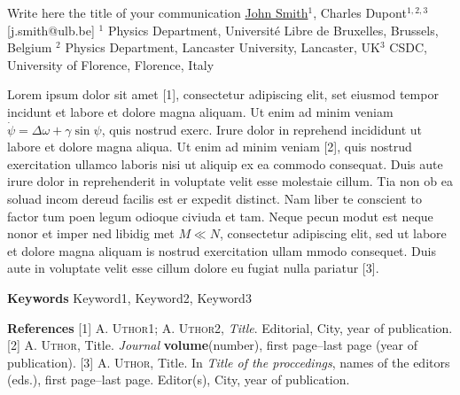 


\begin{abstract_online}{Write here the title of your communication}{%
        \underline{John Smith}$^{1}$, Charles Dupont$^{1,2,3}$}{[j.smith@ulb.be]
        }{%
        $^1$ Physics Department, Université Libre de Bruxelles, Brussels, Belgium \newline{}$^2$ Physics Department, Lancaster University, Lancaster, UK\newline{}$^3$ CSDC, University of Florence, Florence, Italy}
    
Lorem ipsum dolor sit amet [1], consectetur adipiscing elit, set eiusmod tempor incidunt et labore et dolore magna aliquam. Ut enim ad minim veniam $\dot \psi = \Delta \omega + \gamma \sin \psi $, quis nostrud exerc. Irure dolor in reprehend incididunt ut labore et dolore magna aliqua. Ut enim ad minim veniam [2], quis nostrud exercitation ullamco laboris nisi ut aliquip ex ea commodo consequat. Duis aute irure dolor in reprehenderit in voluptate velit esse molestaie cillum. Tia non ob ea soluad incom dereud facilis est er expedit distinct. Nam liber te conscient to factor tum poen legum odioque civiuda et tam. Neque pecun modut est neque nonor et imper ned libidig met $M \ll N$, consectetur adipiscing elit, sed ut labore et dolore magna aliquam is nostrud exercitation ullam mmodo consequet. Duis aute in voluptate velit esse cillum dolore eu fugiat nulla pariatur [3]. 

\textbf{Keywords} \newline{} Keyword1, Keyword2, Keyword3

\textbf{References} \newline{}
[1] \textsc{A. Uthor1; A. Uthor2}, \emph{Title}. Editorial, City, year of publication. \newline{}
[2] \textsc{A. Uthor}, Title. \emph{Journal} \textbf{volume}(number), first page--last page  (year of publication). \newline{}
[3] \textsc{A. Uthor}, Title. In \emph{Title of the proccedings}, names of the editors (eds.), first page--last page. Editor(s), City, year of publication. \newline{}
\end{abstract_online}
    